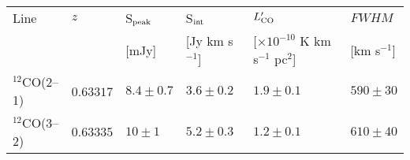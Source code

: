\documentclass[a4paper,fleqn,usenatbib]{mnras}
\newcommand{\GalA}{J0423A}
\newcommand{\GalB}{J0423B}
\begin{document}
\begin{table*}
\caption{ALMA detection of the galaxy \GalB}
\begin{tabular}{llllll}
\hline
Line & $z$ & S$_{\rm peak}$ & S$_{\rm int}$& $L'_{\rm CO}$& $FWHM$\\
 & & [mJy] & [Jy km s$^{-1}$] & [$ \times10^{-10}$ K km s$^{-1}$ pc$^{2}$]&  [km s$^{-1}$]\\
\hline
$^{12}$CO(2--1) & $0.6331$7 & $8.4 \pm 0.7$ & $3.6 \pm 0.2$ & $1.9 \pm 0.1$ & $590 \pm 30$\\
$^{12}$CO(3--2) & $0.63335$ & $10 \pm 1$ & $5.2 \pm 0.3 $ & $1.2 \pm 0.1$ & $610 \pm 40$\\
\hline
\end{tabular}
\label{TabCOemissionSummary}
 \end{table*}

\begin{figure*}
\centering
{}
\caption{Zoom in on \GalB\ in Fig.~\ref{Fig.Overview1}. The $1.2$~mm continuum emission is shown in grey scales on the left and the MUSE reconstructed white light image is shown in grey scales on the right. In both panels we show the ALMA $^{12}$CO(2--1) in red contours, ALMA $^{12}$CO (3--2) in cyan contours at $3$, $5$, $7$ sigma of the respective mapdf overlaid. The ellipdfes in the lower left corner show the beam size in the Band~4 and Band~6 observations where the red ellipdfe corresponds to the beam in the $^{12}$CO(2--1) line map, the cyan ellipdfe corresponds to the beam in the $^{12}$CO(3--2) emission line map and the black ellipdfe corresponds to the beam in the $1.2$~mm continuum map. Negative contours are marked with dashed lines, but are not present in this close-up.}%
\label{FigMUSEALMA}
\end{figure*}
\end{document}
